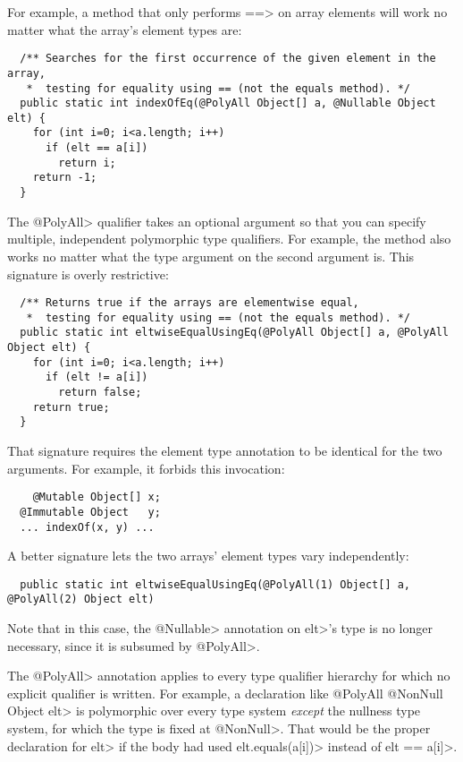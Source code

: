 For example, a method that only performs \<==> on array elements will work
no matter what the array's element types are:

\begin{Verbatim}
  /** Searches for the first occurrence of the given element in the array,
   *  testing for equality using == (not the equals method). */
  public static int indexOfEq(@PolyAll Object[] a, @Nullable Object elt) {
    for (int i=0; i<a.length; i++)
      if (elt == a[i])
        return i;
    return -1;
  }
\end{Verbatim}

The \<@PolyAll> qualifier takes an optional argument so that you can
specify multiple, independent polymorphic type qualifiers.  For example,
the method also works no matter what the type argument on the second
argument is.  This signature is overly restrictive:

\begin{Verbatim}
  /** Returns true if the arrays are elementwise equal,
   *  testing for equality using == (not the equals method). */
  public static int eltwiseEqualUsingEq(@PolyAll Object[] a, @PolyAll Object elt) {
    for (int i=0; i<a.length; i++)
      if (elt != a[i])
        return false;
    return true;
  }
\end{Verbatim}

\noindent
That signature requires the element type annotation to be identical for the
two arguments.  For example, it forbids this invocation:

\begin{Verbatim}
    @Mutable Object[] x;
  @Immutable Object   y;
  ... indexOf(x, y) ...
\end{Verbatim}

\noindent
A better signature lets the two arrays' element types vary independently:

\begin{Verbatim}
  public static int eltwiseEqualUsingEq(@PolyAll(1) Object[] a, @PolyAll(2) Object elt)
\end{Verbatim}

\noindent
Note that in this case, the \<@Nullable> annotation on \<elt>'s type is no
longer necessary, since it is subsumed by \<@PolyAll>.

The \<@PolyAll> annotation applies to every type qualifier hierarchy for
which no explicit qualifier is written.  For example, a declaration like
\<@PolyAll @NonNull Object elt> is polymorphic over every type system
\emph{except} the nullness type system, for which the type is fixed at
\<@NonNull>.  That would be the proper declaration for \<elt> if the body
had used \<elt.equals(a[i])> instead of \<elt == a[i]>.


